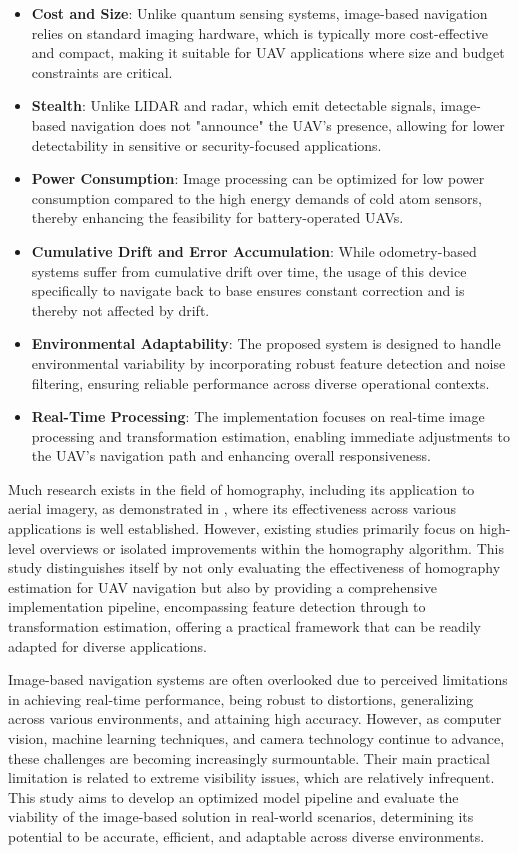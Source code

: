 \begin{itemize}
    \item \textbf{Cost and Size}: Unlike quantum sensing systems, image-based navigation relies on standard imaging hardware, which is typically more cost-effective and compact, making it suitable for UAV applications where size and budget constraints are critical.
    \item \textbf{Stealth}: Unlike LIDAR and radar, which emit detectable signals, image-based navigation does not "announce" the UAV's presence, allowing for lower detectability in sensitive or security-focused applications.
    \item \textbf{Power Consumption}: Image processing can be optimized for low power consumption compared to the high energy demands of cold atom sensors, thereby enhancing the feasibility for battery-operated UAVs.
    \item \textbf{Cumulative Drift and Error Accumulation}: While odometry-based systems suffer from cumulative drift over time, the usage of this device specifically to navigate back to base ensures constant correction and is thereby not affected by drift. 
    \item \textbf{Environmental Adaptability}: The proposed system is designed to handle environmental variability by incorporating robust feature detection and noise filtering, ensuring reliable performance across diverse operational contexts.
    \item \textbf{Real-Time Processing}: The implementation focuses on real-time image processing and transformation estimation, enabling immediate adjustments to the UAV’s navigation path and enhancing overall responsiveness.
\end{itemize}


Much research exists in the field of homography, including its application to aerial imagery, as demonstrated in \cite{Zhang2024}, where its effectiveness across various applications is well established. However, existing studies primarily focus on high-level overviews or isolated improvements within the homography algorithm. This study distinguishes itself by not only evaluating the effectiveness of homography estimation for UAV navigation but also by providing a comprehensive implementation pipeline, encompassing feature detection through to transformation estimation, offering a practical framework that can be readily adapted for diverse applications.

Image-based navigation systems are often overlooked due to perceived limitations in achieving real-time performance, being robust to distortions, generalizing across various environments, and attaining high accuracy. However, as computer vision, machine learning techniques, and camera technology continue to advance, these challenges are becoming increasingly surmountable. Their main practical limitation is related to extreme visibility issues, which are relatively infrequent. This study aims to develop an optimized model pipeline and evaluate the viability of the image-based solution in real-world scenarios, determining its potential to be accurate, efficient, and adaptable across diverse environments.




